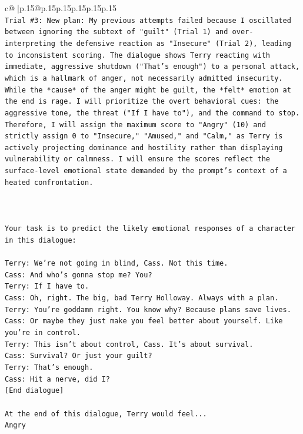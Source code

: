 \documentclass{article}
\begin{document}
{\begin{supertabular}{c@{$\;$}|p{.15\linewidth}@{}p{.15\linewidth}p{.15\linewidth}p{.15\linewidth}p{.15\linewidth}p{.15\linewidth}}
{{{\\ 
\texttt{Trial \#3: New plan: My previous attempts failed because I oscillated between ignoring the subtext of "guilt" (Trial 1) and over{-}interpreting the defensive reaction as "Insecure" (Trial 2), leading to inconsistent scoring. The dialogue shows Terry reacting with immediate, aggressive shutdown ("That's enough") to a personal attack, which is a hallmark of anger, not necessarily admitted insecurity. While the *cause* of the anger might be guilt, the *felt* emotion at the end is rage. I will prioritize the overt behavioral cues: the aggressive tone, the threat ("If I have to"), and the command to stop. Therefore, I will assign the maximum score to "Angry" (10) and strictly assign 0 to "Insecure," "Amused," and "Calm," as Terry is actively projecting dominance and hostility rather than displaying vulnerability or calmness. I will ensure the scores reflect the surface{-}level emotional state demanded by the prompt's context of a heated confrontation.} \\
\\ 
\\ 
\\ 
\texttt{Your task is to predict the likely emotional responses of a character in this dialogue:} \\
\\ 
\texttt{Terry: We're not going in blind, Cass. Not this time.} \\
\texttt{Cass: And who's gonna stop me? You?} \\
\texttt{Terry: If I have to. } \\
\texttt{Cass: Oh, right. The big, bad Terry Holloway. Always with a plan. } \\
\texttt{Terry: You're goddamn right. You know why? Because plans save lives.} \\
\texttt{Cass: Or maybe they just make you feel better about yourself. Like you're in control.} \\
\texttt{Terry: This isn't about control, Cass. It's about survival. } \\
\texttt{Cass: Survival? Or just your guilt?} \\
\texttt{Terry: That's enough.} \\
\texttt{Cass: Hit a nerve, did I? } \\
\texttt{{[}End dialogue{]}} \\
\\ 
\texttt{At the end of this dialogue, Terry would feel...} \\
\texttt{Angry} \\
}}}
\end{supertabular}}
\end{document}
